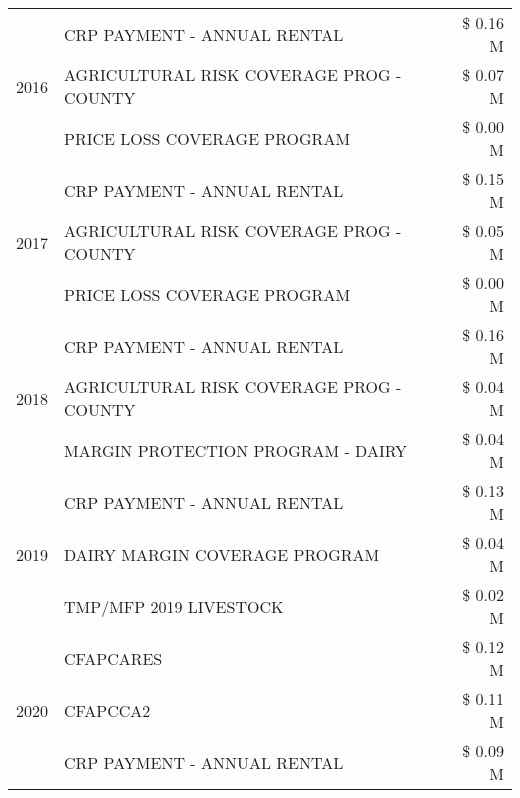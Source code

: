 \begin{tabular}{llr}
\cline{1-3}
\multirow[t]{3}{*}{2016} & CRP PAYMENT - ANNUAL RENTAL & \$ 0.16 M \\
 & AGRICULTURAL RISK COVERAGE PROG - COUNTY & \$ 0.07 M \\
 & PRICE LOSS COVERAGE PROGRAM & \$ 0.00 M \\
\cline{1-3}
\multirow[t]{3}{*}{2017} & CRP PAYMENT - ANNUAL RENTAL & \$ 0.15 M \\
 & AGRICULTURAL RISK COVERAGE PROG - COUNTY & \$ 0.05 M \\
 & PRICE LOSS COVERAGE PROGRAM & \$ 0.00 M \\
\cline{1-3}
\multirow[t]{3}{*}{2018} & CRP PAYMENT - ANNUAL RENTAL & \$ 0.16 M \\
 & AGRICULTURAL RISK COVERAGE PROG - COUNTY & \$ 0.04 M \\
 & MARGIN PROTECTION PROGRAM - DAIRY & \$ 0.04 M \\
\cline{1-3}
\multirow[t]{3}{*}{2019} & CRP PAYMENT - ANNUAL RENTAL & \$ 0.13 M \\
 & DAIRY MARGIN COVERAGE PROGRAM & \$ 0.04 M \\
 & TMP/MFP 2019 LIVESTOCK & \$ 0.02 M \\
\cline{1-3}
\multirow[t]{3}{*}{2020} & CFAPCARES & \$ 0.12 M \\
 & CFAPCCA2 & \$ 0.11 M \\
 & CRP PAYMENT - ANNUAL RENTAL & \$ 0.09 M \\
\cline{1-3}
\bottomrule
\end{tabular}
